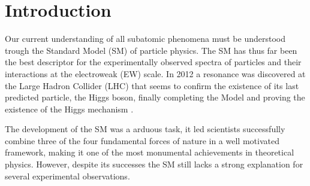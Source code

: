 
\newpage

\chapter{Introduction}
\label{Chap:Introduction}


Our current understanding of all subatomic phenomena must be understood trough the Standard Model (SM) of particle physics. 
%
The SM has thus far been the best descriptor for the experimentally observed spectra of particles and their interactions at the electroweak (EW) scale. 
%
In 2012 a resonance was discovered at the Large Hadron Collider (LHC) that seems to confirm the existence of its last predicted particle, the Higgs boson, finally completing the Model and proving the existence of the Higgs mechanism \cite{Aad_2012,chatrchyan2012observation,
collaborations2015combined,collaborations2016measurements}. 

The development of the SM was a arduous task, it led scientists  successfully combine three of the four fundamental forces of nature in a well motivated framework, making it one of the most monumental achievements in theoretical physics.
%
However, despite its successes\Joaoadd{,} the SM still lacks a strong explanation for several experimental observations. 
%


